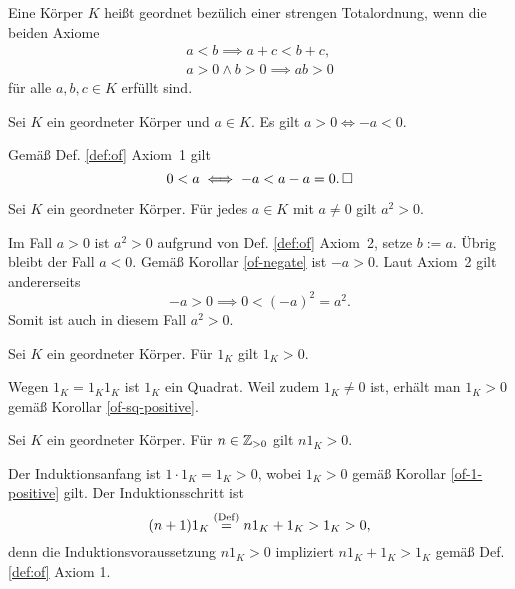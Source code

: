 \begin{Definition}\label{def:of}
Eine Körper $K$ heißt geordnet bezülich einer strengen Totalordnung,
wenn die beiden Axiome
\begin{gather*}
a<b \implies a+c<b+c,\\
a>0\land b>0\implies ab>0
\end{gather*}
für alle $a,b,c\in K$ erfüllt sind.
\end{Definition}

\begin{Korollar}\label{of-negate}
Sei $K$ ein geordneter Körper und $a\in K$. Es gilt $a>0\iff -a<0$. 
\end{Korollar}
\begin{Beweis}
Gemäß Def. \ref{def:of} Axiom~1 gilt%
\[0<a \iff -a < a-a = 0.\,\square\]
\end{Beweis}

\begin{Korollar}\label{of-sq-positive}
Sei $K$ ein geordneter Körper. Für jedes $a\in K$ mit $a\ne 0$ gilt
$a^2>0$.
\end{Korollar}
\begin{Beweis}
Im Fall $a>0$ ist $a^2>0$ aufgrund von Def. \ref{def:of} Axiom~2, setze
$b:=a$.
Übrig bleibt der Fall $a<0$. Gemäß Korollar \ref{of-negate} ist
$-a>0$. Laut Axiom~2 gilt andererseits%
\[-a > 0 \implies 0 < (-a)^2 = a^2.\]
Somit ist auch in diesem Fall $a^2>0$.\,\qedsymbol
\end{Beweis}

\begin{Korollar}\label{of-1-positive}
Sei $K$ ein geordneter Körper. Für $1_K$ gilt $1_K>0$.
\end{Korollar}

\begin{Beweis}
Wegen $1_K = 1_K 1_K$ ist $1_K$ ein Quadrat. Weil zudem $1_K\ne 0$ ist,
erhält man $1_K>0$ gemäß Korollar \ref{of-sq-positive}.\,\qedsymbol
\end{Beweis}

\begin{Korollar}
Sei $K$ ein geordneter Körper. Für $n\in\mathbb Z_{>0}$ gilt $n1_K>0$.
\end{Korollar}

\begin{Beweis}
Der Induktionsanfang ist $1\cdot 1_K = 1_K > 0$, wobei $1_K>0$ gemäß
Korollar \ref{of-1-positive} gilt. Der Induktionsschritt ist
\[(n+1)1_K \stackrel{\mathrm{(Def)}}{=} n1_K + 1_K > 1_K > 0,\]
denn die Induktionsvoraussetzung $n1_K>0$ impliziert
$n1_K+1_K>1_K$ gemäß Def. \ref{def:of} Axiom 1.\,\qedsymbol
\end{Beweis}

